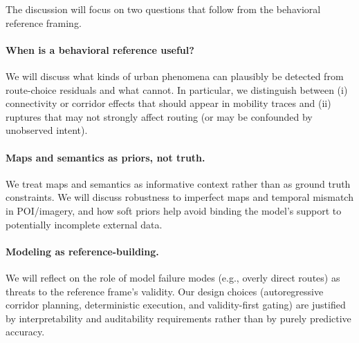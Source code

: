 The discussion will focus on two questions that follow from the behavioral reference framing.

\paragraph{When is a behavioral reference useful?}
We will discuss what kinds of urban phenomena can plausibly be detected from route-choice residuals and what cannot. In particular, we distinguish between (i) connectivity or corridor effects that should appear in mobility traces and (ii) ruptures that may not strongly affect routing (or may be confounded by unobserved intent).

\paragraph{Maps and semantics as priors, not truth.}
We treat maps and semantics as informative context rather than as ground truth constraints. We will discuss robustness to imperfect maps and temporal mismatch in POI/imagery, and how soft priors help avoid binding the model's support to potentially incomplete external data.

\paragraph{Modeling as reference-building.}
We will reflect on the role of model failure modes (e.g., overly direct routes) as threats to the reference frame's validity. Our design choices (autoregressive corridor planning, deterministic execution, and validity-first gating) are justified by interpretability and auditability requirements rather than by purely predictive accuracy.
